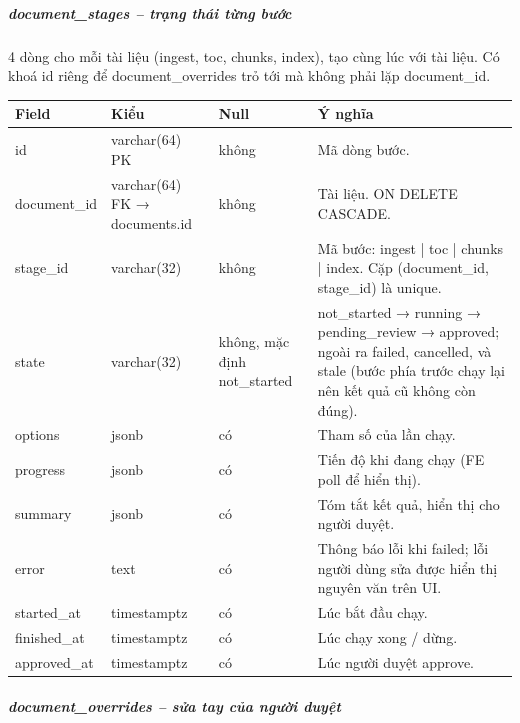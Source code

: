 \subparagraph{document\_stages -- trạng thái từng bước}

4 dòng cho mỗi tài liệu (ingest, toc, chunks, index), tạo cùng lúc với tài liệu. Có khoá id riêng để document\_overrides trỏ tới mà không phải lặp document\_id.
\begin{longtable}{|>{\raggedright\arraybackslash}p{0.250\dimexpr\linewidth-8\tabcolsep\relax}|>{\raggedright\arraybackslash}p{0.250\dimexpr\linewidth-8\tabcolsep\relax}|>{\raggedright\arraybackslash}p{0.250\dimexpr\linewidth-8\tabcolsep\relax}|>{\raggedright\arraybackslash}p{0.250\dimexpr\linewidth-8\tabcolsep\relax}|}
\hline
\textbf{Field} & \textbf{Kiểu} & \textbf{Null} & \textbf{Ý nghĩa} \\ \hline
\endhead
id & varchar(64) PK & không & Mã dòng bước. \\ \hline
document\_id & varchar(64) FK → documents.id & không & Tài liệu. ON DELETE CASCADE. \\ \hline
stage\_id & varchar(32) & không & Mã bước: ingest | toc | chunks | index. Cặp (document\_id, stage\_id) là unique. \\ \hline
state & varchar(32) & không, mặc định not\_started & not\_started → running → pending\_review → approved; ngoài ra failed, cancelled, và stale (bước phía trước chạy lại nên kết quả cũ không còn đúng). \\ \hline
options & jsonb & có & Tham số của lần chạy. \\ \hline
progress & jsonb & có & Tiến độ khi đang chạy (FE poll để hiển thị). \\ \hline
summary & jsonb & có & Tóm tắt kết quả, hiển thị cho người duyệt. \\ \hline
error & text & có & Thông báo lỗi khi failed; lỗi người dùng sửa được hiển thị nguyên văn trên UI. \\ \hline
started\_at & timestamptz & có & Lúc bắt đầu chạy. \\ \hline
finished\_at & timestamptz & có & Lúc chạy xong / dừng. \\ \hline
approved\_at & timestamptz & có & Lúc người duyệt approve. \\ \hline
\end{longtable}

\subparagraph{document\_overrides -- sửa tay của người duyệt}

